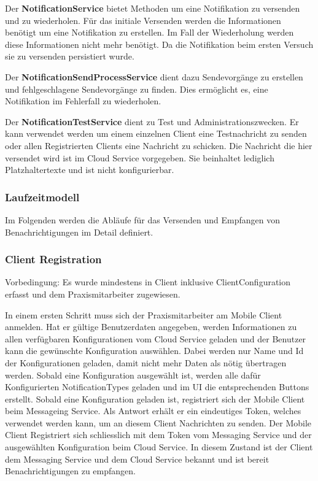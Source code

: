 Der \textbf{NotificationService} bietet Methoden um eine Notifikation zu versenden und zu wiederholen.
Für das initiale Versenden werden die Informationen benötigt um eine Notifikation zu erstellen.
Im Fall der Wiederholung werden diese Informationen nicht mehr benötigt.
Da die Notifikation beim ersten Versuch sie zu versenden persistiert wurde.

Der \textbf{NotificationSendProcessService} dient dazu Sendevorgänge zu erstellen und fehlgeschlagene Sendevorgänge zu finden.
Dies ermöglicht es, eine Notifikation im Fehlerfall zu wiederholen.

Der \textbf{NotificationTestService} dient zu Test und Administrationszwecken.
Er kann verwendet werden um einem einzelnen Client eine Testnachricht zu senden oder allen Registrierten Clients eine Nachricht zu schicken.
Die Nachricht die hier versendet wird ist im Cloud Service vorgegeben.
Sie beinhaltet lediglich Platzhaltertexte und ist nicht konfigurierbar.

\clearpage
\subsubsection{Laufzeitmodell}

Im Folgenden werden die Abläufe für das Versenden und Empfangen von Benachrichtigungen im Detail definiert.

\subsubsection*{Client Registration}

Vorbedingung: Es wurde mindestens in Client inklusive ClientConfiguration erfasst und dem Praxismitarbeiter zugewiesen.

In einem ersten Schritt muss sich der Praxismitarbeiter am Mobile Client anmelden.
Hat er gültige Benutzerdaten angegeben, werden Informationen zu allen verfügbaren Konfigurationen vom Cloud Service geladen und der Benutzer kann die gewünschte Konfiguration auswählen.
Dabei werden nur Name und Id der Konfigurationen geladen, damit nicht mehr Daten als nötig übertragen werden.
Sobald eine Konfiguration ausgewählt ist, werden alle dafür Konfigurierten NotificationTypes geladen und im UI die entsprechenden Buttons erstellt.
Sobald eine Konfiguration geladen ist, registriert sich der Mobile Client beim Messageing Service.
Als Antwort erhält er ein eindeutiges Token, welches verwendet werden kann, um an diesem Client Nachrichten zu senden.
Der Mobile Client Registriert sich schliesslich mit dem Token vom Messaging Service und der ausgewählten Konfiguration beim Cloud Service.
In diesem Zustand ist der Client dem Messaging Service und dem Cloud Service bekannt und ist bereit Benachrichtigungen zu empfangen.

